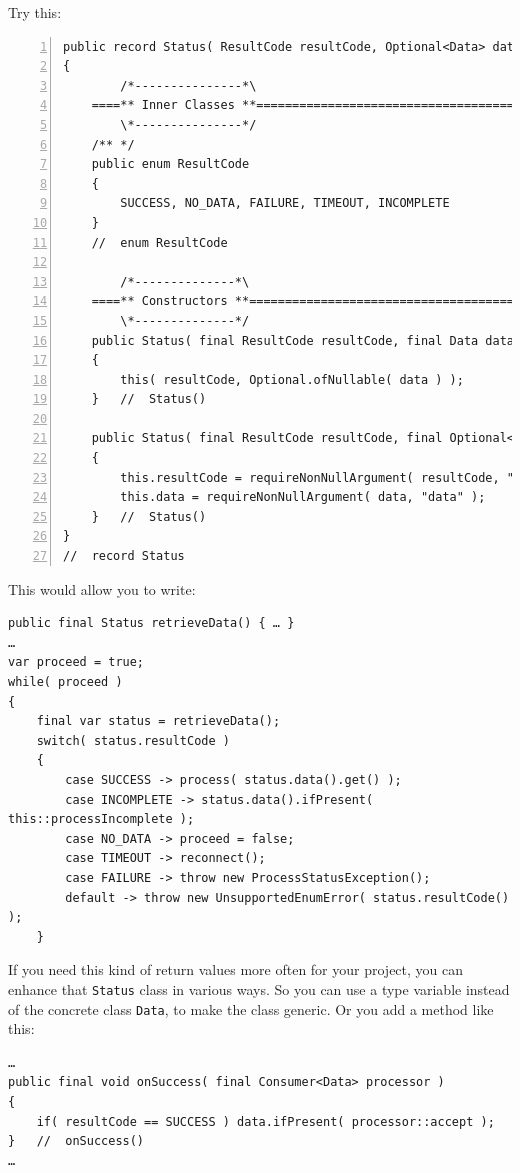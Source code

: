 \documentclass[11pt,a4paper, titlepage, parskip=half, headsepline, footsepline, cleardoublepage=current, headheight=1cm]{scrbook}
\begin{document}
Try this:
\begin{lstlisting}[numbers=left,caption={Status Record}]
public record Status( ResultCode resultCode, Optional<Data> data )
{
        /*---------------*\
    ====** Inner Classes **==========================================
        \*---------------*/
    /** */
    public enum ResultCode
    {
        SUCCESS, NO_DATA, FAILURE, TIMEOUT, INCOMPLETE
    }
    //  enum ResultCode
    
        /*--------------*\
    ====** Constructors **===========================================
        \*--------------*/
    public Status( final ResultCode resultCode, final Data data )
    {
        this( resultCode, Optional.ofNullable( data ) );
    }   //  Status()

    public Status( final ResultCode resultCode, final Optional<Data> data )
    {
        this.resultCode = requireNonNullArgument( resultCode, "resultCode" );
        this.data = requireNonNullArgument( data, "data" );
    }   //  Status()
}
//  record Status
\end{lstlisting}

This would allow you to write:
\begin{lstlisting}
public final Status retrieveData() { … }
…
var proceed = true;
while( proceed )
{
    final var status = retrieveData();
    switch( status.resultCode )
    {
        case SUCCESS -> process( status.data().get() );
        case INCOMPLETE -> status.data().ifPresent( this::processIncomplete );
        case NO_DATA -> proceed = false;
        case TIMEOUT -> reconnect();
        case FAILURE -> throw new ProcessStatusException();
        default -> throw new UnsupportedEnumError( status.resultCode() );
    }
\end{lstlisting}

If you need this kind of return values more often for your project, you can enhance that \lstinline|Status| class in various ways. So you can use a type variable instead of the concrete class \lstinline|Data|, to make the class generic. Or you add a method like this:
\begin{lstlisting}
…
public final void onSuccess( final Consumer<Data> processor )
{
    if( resultCode == SUCCESS ) data.ifPresent( processor::accept );
}   //  onSuccess()
…
\end{lstlisting}
\end{document}

